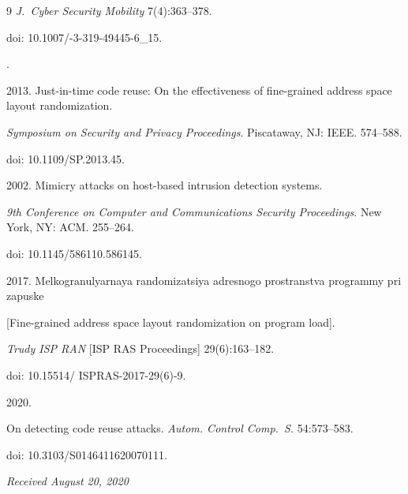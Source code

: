{{\begin{thebibliography}{9}
\textit{J.~Cyber Security Mobility} 7(4):363--378. 

doi: 10.1007\!/-3-319-49445-6\_15.




. 

2013. Just-in-time code reuse: On the effectiveness of fine-grained address space layout randomization.

 \textit{Symposium on Security and Privacy Proceedings}. Piscataway, NJ: IEEE. 574--588. 

 doi: 10.1109\!/\!SP.2013.45.

 


 2002. Mimicry attacks on host-based intrusion detection systems. 

\textit{9th Conference on Computer and Communications Security Proceedings}. New York, NY: ACM. 255--264.

 doi: 10.1145/586110.586145.





2017. Melkogranulyarnaya randomizatsiya adresnogo prostranstva programmy pri zapuske 

[Fine-grained address space layout randomization on program load]. 

\textit{Trudy ISP RAN} [ISP RAS Proceedings] 29(6):163--182. 

doi: 10.15514\!/ ISPRAS-2017-29(6)-9.




 2020.

On detecting code reuse attacks. \textit{Autom. Control Comp.~S.} 54:573--583. 

 doi: 10.3103\!/\!S0146411620070111.

\end{thebibliography}

} }



\vspace*{-3pt}



\hfill{\small\textit{Received August 20, 2020}} 



